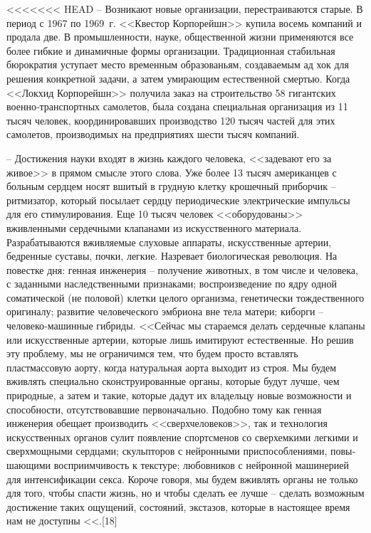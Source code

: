 \documentclass{book}
\begin{document}
{<<<<<<< HEAD
-- Возникают новые организации, перестраиваются старые. В период с 1967 по 1969~г. <<Квестор Корпорейшн>> купила восемь компаний и продала две. В промышленности, науке, общественной жизни применяются все более гибкие и динамичные формы организации. Традиционная стабильная бюрократия уступает место временным образованьям, создаваемым ад хок для решения конкретной задачи, а затем умирающим естественной смертью. Когда <<Локхид Корпорейшн>> получила заказ на строительство 58 гигантских военно‑транспортных самолетов, была создана специальная организация из 11 тысяч человек, координировавших производство 120 тысяч частей для этих самолетов, производимых на предприятиях шести тысяч компаний.

-- Достижения науки входят в жизнь каждого человека, <<задевают его за живое>> в прямом смысле этого слова. Уже бо­лее 13 тысяч американцев с больным сердцем носят вшитый в грудную клетку крошечный приборчик -- ритмизатор, который посылает сердцу периодические электрические импульсы для его стимулирования. Еще 10 тысяч человек <<оборудованы>> вживленными сердечными клапанами из искусственного материала. Разрабатываются вживляемые слуховые аппараты, искусственные артерии, бедренные суставы, почки, легкие. Назревает биологическая революция. На повестке дня: генная инже­нерия -- получение животных, в том числе и человека, с заданными наследственными признаками; воспроизведение по ядру одной соматической (не половой) клетки целого организма, генетически тождественного оригиналу; развитие человеческого эмбриона вне тела матери; киборги -- человеко‑машинные гибриды. <<Сейчас мы стараемся делать сердечные клапаны или искусственные артерии, которые лишь имитируют естественные. Но решив эту проблему, мы не ограничимся тем, что будем просто вставлять пластмассовую аорту, когда натуральная аорта выходит из строя. Мы будем вживлять специально сконструированные органы, которые будут лучше,  чем природные, а затем и такие, которые дадут их владельцу новые возможности и способности, отсутствовавшие первоначально. Подобно тому как генная инженерия обещает производить <<сверхчеловеков>>, так и технология искусственных органов сулит появление спортсменов со сверхемкими легкими и сверхмощными серд­цами; скульпторов с нейронными приспособлениями, повы­шающими восприимчивость к текстуре; любовников с ней­ронной машинерией для интенсификации секса. Короче говоря, мы будем вживлять органы не только для того, чтобы спасти жизнь, но и чтобы сделать ее лучше -- сделать возможным дости­жение таких ощущений, состояний, экстазов, которые в насто­ящее время нам не доступны <<.[18]

}
\end{document}
